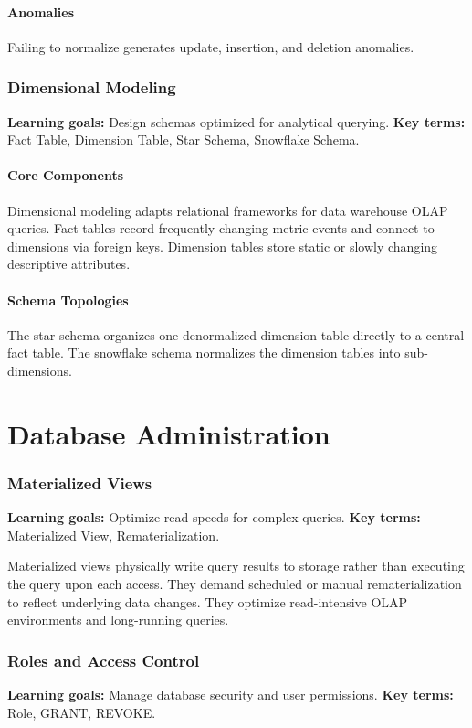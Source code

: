 \documentclass[12pt, a4paper]{article}
\begin{document}
\subsection{Anomalies}
Failing to normalize generates update, insertion, and deletion anomalies.

\section{Dimensional Modeling}
\textbf{Learning goals:} Design schemas optimized for analytical querying.
\textbf{Key terms:} Fact Table, Dimension Table, Star Schema, Snowflake Schema.

\subsection{Core Components}
Dimensional modeling adapts relational frameworks for data warehouse OLAP queries.
Fact tables record frequently changing metric events and connect to dimensions via foreign keys.
Dimension tables store static or slowly changing descriptive attributes.

\subsection{Schema Topologies}
The star schema organizes one denormalized dimension table directly to a central fact table.
The snowflake schema normalizes the dimension tables into sub-dimensions.

\part{Database Administration}

\section{Materialized Views}
\textbf{Learning goals:} Optimize read speeds for complex queries.
\textbf{Key terms:} Materialized View, Rematerialization.

Materialized views physically write query results to storage rather than executing the query upon each access.
They demand scheduled or manual rematerialization to reflect underlying data changes.
They optimize read-intensive OLAP environments and long-running queries.

\section{Roles and Access Control}
\textbf{Learning goals:} Manage database security and user permissions.
\textbf{Key terms:} Role, GRANT, REVOKE.
\end{document}
